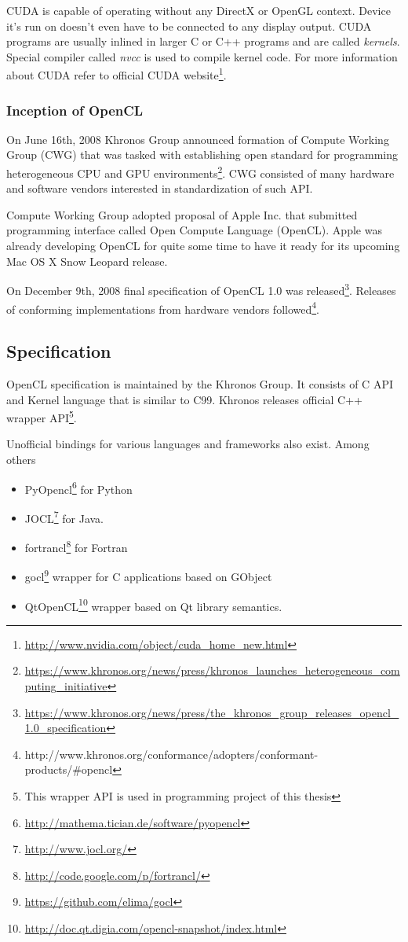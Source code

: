 CUDA is capable of operating without any DirectX or OpenGL context. Device it's
run on doesn't even have to be connected to any display output. CUDA programs
are usually inlined in larger C or C++ programs and are called \emph{kernels}.
Special compiler called \emph{nvcc} is used to compile kernel code. For more
information about CUDA refer to official CUDA website\footnote{\url{http://www.nvidia.com/object/cuda_home_new.html}}.

\subsubsection{Inception of OpenCL}

On June 16th, 2008 Khronos Group announced formation of Compute Working Group (CWG)
that was tasked with establishing open standard for programming heterogeneous
CPU and GPU environments\footnote{\url{https://www.khronos.org/news/press/khronos\_launches\_heterogeneous\_computing\_initiative}}.
CWG consisted of many hardware and software vendors interested in
standardization of such API.

Compute Working Group adopted proposal of Apple Inc. that submitted programming
interface called Open Compute Language (OpenCL). Apple was already developing
OpenCL for quite some time to have it ready for its upcoming Mac OS X Snow
Leopard release.

On December 9th, 2008 final specification of OpenCL 1.0 was
released\footnote{\url{https://www.khronos.org/news/press/the\_khronos\_group\_releases\_opencl\_1.0\_specification}}.
Releases of conforming implementations from hardware vendors followed\footnote{http://www.khronos.org/conformance/adopters/conformant-products/\#opencl}.

\subsection{Specification}
OpenCL specification is maintained by the Khronos Group. It consists of C API
and Kernel language that is similar to C99. Khronos releases official C++
wrapper API\footnote{This wrapper API is used in programming project of this thesis}.

Unofficial bindings for various languages and frameworks also exist. Among others
\begin{itemize}
	\item PyOpencl\footnote{\url{http://mathema.tician.de/software/pyopencl}}
		for Python
	\item JOCL\footnote{\url{http://www.jocl.org/}} for Java.
	\item fortrancl\footnote{\url{http://code.google.com/p/fortrancl/}} for Fortran
	\item gocl\footnote{\url{https://github.com/elima/gocl}} wrapper for C
		applications based on GObject
	\item QtOpenCL\footnote{\url{http://doc.qt.digia.com/opencl-snapshot/index.html}}
		wrapper based on Qt library semantics.
\end{itemize}

